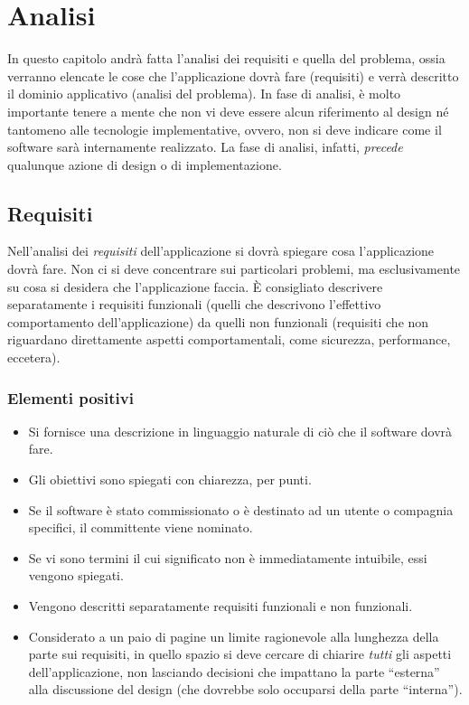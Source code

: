 \documentclass[a4paper,12pt]{report}
\begin{document}
\tableofcontents

\chapter{Analisi}

In questo capitolo andrà fatta l'analisi dei requisiti e quella del problema, ossia verranno elencate le cose che l'applicazione dovrà fare (requisiti) e verrà descritto il dominio applicativo (analisi del problema).
%
In fase di analisi, è molto importante tenere a mente che non vi deve essere alcun riferimento al design né tantomeno alle tecnologie implementative, ovvero, non si deve indicare come il software sarà internamente realizzato.
%
La fase di analisi, infatti, \textit{precede} qualunque azione di design o di implementazione.

\section{Requisiti}

Nell'analisi dei \emph{requisiti} dell'applicazione si dovrà spiegare cosa l'applicazione dovrà fare.
%
Non ci si deve concentrare sui particolari problemi, ma esclusivamente su cosa si desidera che l'applicazione faccia.
%
È consigliato descrivere separatamente i requisiti funzionali (quelli che descrivono l'effettivo
comportamento dell'applicazione) da quelli non funzionali (requisiti che non riguardano direttamente
aspetti comportamentali, come sicurezza, performance, eccetera).

\subsection*{Elementi positivi}
\begin{itemize}
	\item Si fornisce una descrizione in linguaggio naturale di ciò che il software dovrà fare.
	\item Gli obiettivi sono spiegati con chiarezza, per punti.
	\item Se il software è stato commissionato o è destinato ad un utente o compagnia specifici, il committente viene nominato.
	\item Se vi sono termini il cui significato non è immediatamente intuibile, essi vengono spiegati.
	\item Vengono descritti separatamente requisiti funzionali e non funzionali.
	\item Considerato a un paio di pagine un limite ragionevole alla lunghezza della parte sui requisiti, in quello spazio si deve cercare di chiarire \textit{tutti} gli aspetti dell'applicazione, non lasciando decisioni che impattano la parte ``esterna'' alla discussione del design (che dovrebbe solo occuparsi della parte ``interna'').
\end{itemize}
\end{document}
